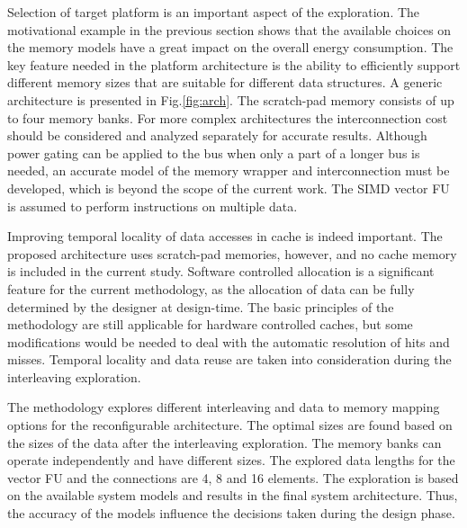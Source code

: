 \documentclass[prodmode,acmtecs]{acmsmall}
\begin{document}
Selection of target platform is an important aspect of the exploration.
The motivational example in the previous section shows that the available choices on the memory models have a great impact on the overall energy consumption.
 The key feature needed in the platform architecture is the ability to efficiently support different memory sizes that are suitable for different data structures.
A generic architecture is presented in Fig.\ref{fig:arch}.
The scratch-pad memory consists of up to four memory banks. 
For more complex architectures the interconnection cost should be considered and analyzed separately for accurate results. 
Although power gating can be applied to the bus when only a part of a longer bus is needed, an accurate model of the memory wrapper and interconnection must be developed, which is beyond the scope of the current work.
The SIMD vector FU is assumed to perform instructions on multiple data.

Improving temporal locality of data accesses in cache is indeed important. 
The proposed architecture uses scratch-pad memories, however, and no cache memory is included in the current study.
Software controlled allocation is a significant feature for the current methodology, as the allocation of data can be fully determined by the designer at design-time.
The basic principles of the methodology are still applicable for hardware controlled caches, but some modifications would be needed to deal with the automatic resolution of hits and misses.
Temporal locality and data reuse are taken into consideration during the interleaving exploration.

The methodology explores different interleaving and data to memory mapping options for the reconfigurable architecture.
The optimal sizes are found based on the sizes of the data after the interleaving exploration.
The memory banks can operate independently and have different sizes.
The explored data lengths for the vector FU and the connections are 4, 8 and 16 elements.
The exploration is based on the available system models and results in the final system architecture.
Thus, the accuracy of the models influence the decisions taken during the design phase.
\end{document}
